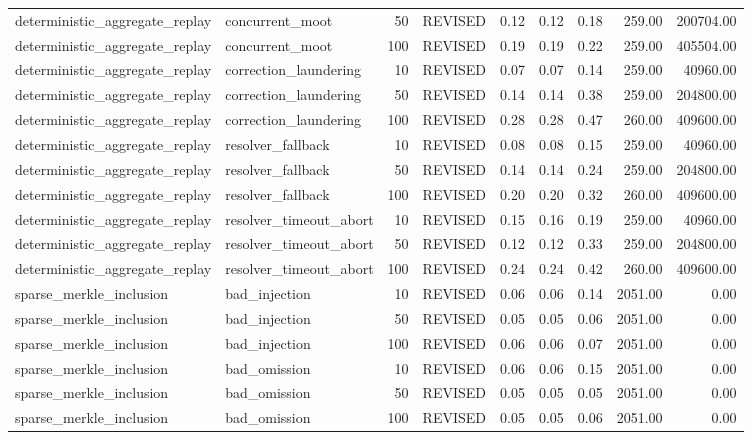 \begin{table}
\begin{tabular}{llrlrrrrr}
deterministic\_aggregate\_replay & concurrent\_moot & 50 & REVISED & 0.12 & 0.12 & 0.18 & 259.00 & 200704.00 \\
deterministic\_aggregate\_replay & concurrent\_moot & 100 & REVISED & 0.19 & 0.19 & 0.22 & 259.00 & 405504.00 \\
deterministic\_aggregate\_replay & correction\_laundering & 10 & REVISED & 0.07 & 0.07 & 0.14 & 259.00 & 40960.00 \\
deterministic\_aggregate\_replay & correction\_laundering & 50 & REVISED & 0.14 & 0.14 & 0.38 & 259.00 & 204800.00 \\
deterministic\_aggregate\_replay & correction\_laundering & 100 & REVISED & 0.28 & 0.28 & 0.47 & 260.00 & 409600.00 \\
deterministic\_aggregate\_replay & resolver\_fallback & 10 & REVISED & 0.08 & 0.08 & 0.15 & 259.00 & 40960.00 \\
deterministic\_aggregate\_replay & resolver\_fallback & 50 & REVISED & 0.14 & 0.14 & 0.24 & 259.00 & 204800.00 \\
deterministic\_aggregate\_replay & resolver\_fallback & 100 & REVISED & 0.20 & 0.20 & 0.32 & 260.00 & 409600.00 \\
deterministic\_aggregate\_replay & resolver\_timeout\_abort & 10 & REVISED & 0.15 & 0.16 & 0.19 & 259.00 & 40960.00 \\
deterministic\_aggregate\_replay & resolver\_timeout\_abort & 50 & REVISED & 0.12 & 0.12 & 0.33 & 259.00 & 204800.00 \\
deterministic\_aggregate\_replay & resolver\_timeout\_abort & 100 & REVISED & 0.24 & 0.24 & 0.42 & 260.00 & 409600.00 \\
sparse\_merkle\_inclusion & bad\_injection & 10 & REVISED & 0.06 & 0.06 & 0.14 & 2051.00 & 0.00 \\
sparse\_merkle\_inclusion & bad\_injection & 50 & REVISED & 0.05 & 0.05 & 0.06 & 2051.00 & 0.00 \\
sparse\_merkle\_inclusion & bad\_injection & 100 & REVISED & 0.06 & 0.06 & 0.07 & 2051.00 & 0.00 \\
sparse\_merkle\_inclusion & bad\_omission & 10 & REVISED & 0.06 & 0.06 & 0.15 & 2051.00 & 0.00 \\
sparse\_merkle\_inclusion & bad\_omission & 50 & REVISED & 0.05 & 0.05 & 0.05 & 2051.00 & 0.00 \\
sparse\_merkle\_inclusion & bad\_omission & 100 & REVISED & 0.05 & 0.05 & 0.06 & 2051.00 & 0.00 \\
\bottomrule
\end{tabular}
\end{table}
